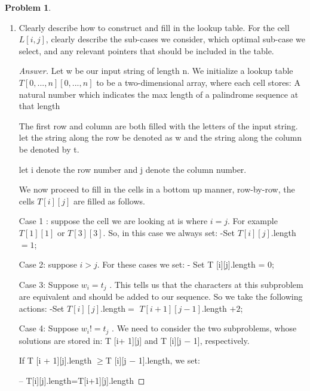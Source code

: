 \documentclass[11pt]{article}
\theoremstyle{definition}
\theoremstyle{definition}
\newtheorem{required}{Problem}
\theoremstyle{definition}
\begin{document}
\begin{required}
\begin{enumerate}[label=(\alph*)]
\begin{proof}[Answer]
\end{proof}



\newpage
\subsection{Problem 2\ref{2b}}
\item \label{2b} Clearly describe how to construct and fill in the lookup table. For the cell $L[i, j]$, clearly describe the sub-cases we consider, which optimal sub-case we select, and any relevant pointers that should be included in the table.

\begin{proof}[Answer]


 Let w be our input string of length n. We initialize a lookup table $T[0,...,n][0,...,n]$ to be a two-dimensional array, where each cell stores:
A natural number which indicates the max length of a palindrome sequence at that length

The first row and column are both filled with the letters of the input string. let the string along the row be denoted as w and the string along the column be denoted by t. 

let i denote the row number and j denote the column number.

We now proceed to fill in the cells in a bottom up manner, row-by-row, the cells $T[i][j]$ are filled as follows.

Case 1 : suppose the cell we are looking at is where $i=j$. For example $T[1][1]$ or $T[3][3]$. So, in this case we always set:
-Set $T [i][j]$.length $=  1$; 

Case 2: suppose $i>j$. For these cases we set:
- Set T [i][j].length = 0; 



Case 3: Suppose $w_i = t_j$ . This tells us that the characters at this subproblem are equivalent and should 
be added to our sequence. So we take the following actions:
-Set $T [i][j]$.length$ =$ $T [i + 1][j − 1]$.length $+ 2$;\







Case 4: Suppose $w_i != t_j$ . We need to consider the two subproblems, whose solutions are stored in: T [i+ 1][j] and T [i][j − 1], respectively. 


If T [i + 1][j].length $\geq $T [i][j − 1].length, we set:

– T[i][j].length=T[i+1][j].length



\end{proof}
\end{enumerate}
\end{required}
\end{document}
